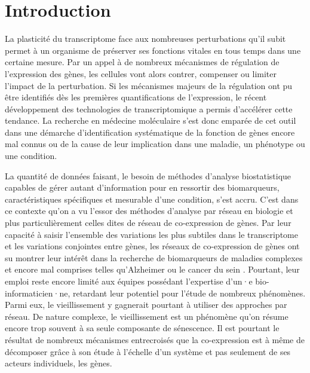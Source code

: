\setcounter{chapter}{1}         %
\setcounter{section}{0}
\chapter*{Introduction}         %
\label{chapter:intro}

La plasticité du transcriptome face aux nombreuses perturbations qu'il subit permet à un organisme de préserver ses fonctions vitales en tous temps dans une certaine mesure. Par un appel à de nombreux mécanismes de régulation de l'expression des gènes, les cellules vont alors contrer, compenser ou limiter l'impact de la perturbation. Si les mécanismes majeurs de la régulation ont pu être identifiés dès les premières quantifications de l'expression, le récent développement des technologies de transcriptomique a permis d'accélérer cette tendance. La recherche en médecine moléculaire s'est donc emparée de cet outil dans une démarche d'identification systématique de la fonction de gènes encore mal connus ou de la cause de leur implication dans une maladie, un phénotype ou une condition.

La quantité de données faisant, le besoin de méthodes d'analyse biostatistique capables de gérer autant d'information pour en ressortir des biomarqueurs, caractéristiques spécifiques et mesurable d'une condition, s'est accru. C'est dans ce contexte qu'on a vu l’essor des méthodes d'analyse par réseau en biologie \cite{Barabasi2004} et plus particulièrement celles dites de réseau de co-expression de gènes. Par leur capacité à saisir l'ensemble des variations les plus subtiles dans le transcriptome et les variations conjointes entre gènes, les réseaux de co-expression de gènes ont su montrer leur intérêt dans la recherche de biomarqueurs de maladies complexes et encore mal comprises telles qu'Alzheimer \cite{Hu2020Nov} ou le cancer du sein \cite{Garcia-Cortes2020Jul}. Pourtant, leur emploi reste encore limité aux équipes possédant l'expertise d'un·e bio-informaticien·ne, retardant leur potentiel pour l'étude de nombreux phénomènes. Parmi eux, le vieillissement y gagnerait pourtant à utiliser des approches par réseau. De nature complexe, le vieillissement est un phénomène qu'on résume encore trop souvent à sa seule composante de sénescence. Il est pourtant le résultat de nombreux mécanismes entrecroisés que la co-expression est à même de décomposer grâce à son étude à l'échelle d'un système et pas seulement de ses acteurs individuels, les gènes.

